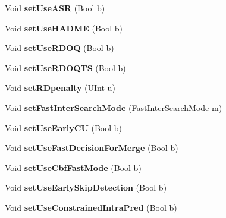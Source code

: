 \begin{DoxyCompactItemize}
\item 
\mbox{\label{class_t_enc_cfg_a9c0869a45ea6a75100dad6395bad1ca0}} 
Void {\bfseries set\+Use\+A\+SR} (Bool b)
\item 
\mbox{\label{class_t_enc_cfg_afce9ec059a759c449d9d5b2d5b9e136a}} 
Void {\bfseries set\+Use\+H\+A\+D\+ME} (Bool b)
\item 
\mbox{\label{class_t_enc_cfg_a147e90c4771ea259e8d04099503a7a58}} 
Void {\bfseries set\+Use\+R\+D\+OQ} (Bool b)
\item 
\mbox{\label{class_t_enc_cfg_a7d0b73f3db4d7c15f777f0c24988046c}} 
Void {\bfseries set\+Use\+R\+D\+O\+Q\+TS} (Bool b)
\item 
\mbox{\label{class_t_enc_cfg_a93291cb785da53b640f9be99f206237b}} 
Void {\bfseries set\+R\+Dpenalty} (U\+Int u)
\item 
\mbox{\label{class_t_enc_cfg_a565b7aefa3926958580ac38281a8d260}} 
Void {\bfseries set\+Fast\+Inter\+Search\+Mode} (Fast\+Inter\+Search\+Mode m)
\item 
\mbox{\label{class_t_enc_cfg_abbb5b69dbf221808cfc156ede641f3e1}} 
Void {\bfseries set\+Use\+Early\+CU} (Bool b)
\item 
\mbox{\label{class_t_enc_cfg_a77eddaf63ee788aeca572503b21134d0}} 
Void {\bfseries set\+Use\+Fast\+Decision\+For\+Merge} (Bool b)
\item 
\mbox{\label{class_t_enc_cfg_abba6088e8bb9b11c4fff330b6e999fd6}} 
Void {\bfseries set\+Use\+Cbf\+Fast\+Mode} (Bool b)
\item 
\mbox{\label{class_t_enc_cfg_a49f40e501183cb30e963faea53f430c6}} 
Void {\bfseries set\+Use\+Early\+Skip\+Detection} (Bool b)
\item 
\mbox{\label{class_t_enc_cfg_acfe436463b7becab031b01c8bdd13822}} 
Void {\bfseries set\+Use\+Constrained\+Intra\+Pred} (Bool b)
\item 
\mbox{\label{class_t_enc_cfg_aaa47c2d3b78d6313ffb689ce03dbee76}} 

\end{DoxyCompactItemize}
